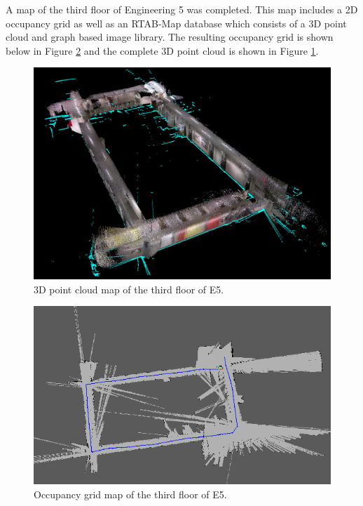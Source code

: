 \documentclass[letterpaper, 10 pt, conference]{ieeeconf}  %
\begin{document}
A map of the third floor of Engineering 5 was completed. This map includes a 2D occupancy grid as well as an RTAB-Map database which consists of a 3D point cloud and graph based image library. The resulting occupancy grid is shown below in Figure \ref{third_occ_grid} and the complete 3D point cloud is shown in Figure \ref{third_point_cloud}.

	\begin{figure}[!ht]
		\centering
		\includegraphics[width=1.0\columnwidth]{Figures/3rdfloor_point_cloud}
		\caption{3D point cloud map of the third floor of E5.}
		\label{third_point_cloud}
	\end{figure}

	\begin{figure}[!ht]
		\centering
		\includegraphics[width=1.0\columnwidth]{Figures/3rd_occupancy_grid}
		\caption{Occupancy grid map of the third floor of E5.}
		\label{third_occ_grid}
	\end{figure}
\end{document}
